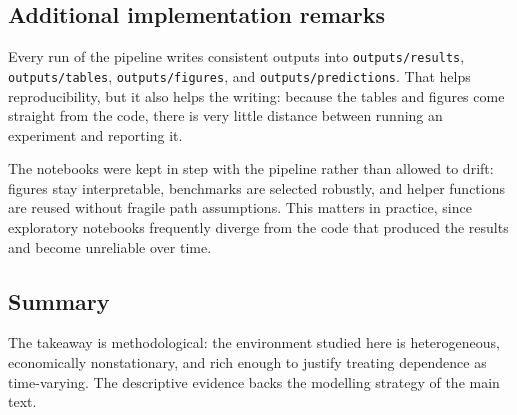 \subsection{Additional implementation remarks}

Every run of the pipeline writes consistent outputs into \texttt{outputs/results}, \texttt{outputs/tables}, \texttt{outputs/figures}, and \texttt{outputs/predictions}. That helps reproducibility, but it also helps the writing: because the tables and figures come straight from the code, there is very little distance between running an experiment and reporting it.

The notebooks were kept in step with the pipeline rather than allowed to drift: figures stay interpretable, benchmarks are selected robustly, and helper functions are reused without fragile path assumptions. This matters in practice, since exploratory notebooks frequently diverge from the code that produced the results and become unreliable over time.

\subsection{Summary}

The takeaway is methodological: the environment studied here is heterogeneous, economically nonstationary, and rich enough to justify treating dependence as time-varying. The descriptive evidence backs the modelling strategy of the main text.
